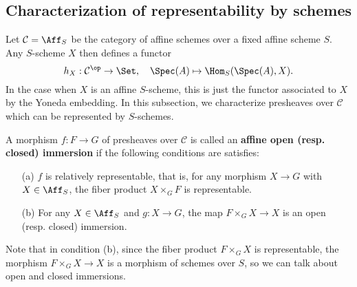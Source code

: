 \subsection{Characterization of representability by schemes}
Let $\mathcal{C}=\Aff_{S}$ be the category of affine schemes over a fixed affine scheme $S$. Any $S$-scheme $X$ then defines a functor
\[h_X:\mathcal{C}^{\op}\to\Set,\quad \Spec(A)\mapsto\Hom_S(\Spec(A),X).\]
In the case when $X$ is an affine $S$-scheme, this is just the functor associated to $X$ by the Yoneda embedding. In this subsection, we characterize presheaves over $\mathcal{C}$ which can be represented by $S$-schemes.

\begin{definition}
A morphism $f:F\to G$ of presheaves over $\mathcal{C}$ is called an \textbf{affine open (resp. closed) immersion} if the following conditions are satisfies:
\begin{enumerate}
    \item[(a)] $f$ is relatively representable, that is, for any morphism $X\to G$ with $X\in\Aff_S$, the fiber product $X\times_GF$ is representable.
    \item[(b)] For any $X\in\Aff_S$ and $g:X\to G$, the map $F\times_GX\to X$ is an open (resp. closed) immersion. 
\end{enumerate}
\end{definition}

Note that in condition (b), since the fiber product $F\times_GX$ is representable, the morphism $F\times_GX\to X$ is a morphism of schemes over $S$, so we can talk about open and closed immersions.

